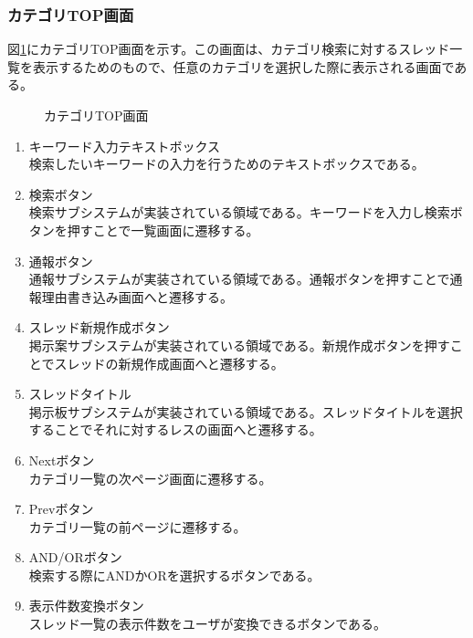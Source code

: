 \documentclass[a4j]{jarticle}
\begin{document}
\subsubsection{カテゴリTOP画面}
図\ref{fig:category_top}にカテゴリTOP画面を示す。この画面は、カテゴリ検索に対するスレッド一覧を表示するためのもので、任意のカテゴリを選択した際に表示される画面である。
\begin{figure}[H]
\centering
{}
\caption{カテゴリTOP画面}
\label{fig:category_top}
\end{figure}
\begin{enumerate}
  \renewcommand{\labelenumi}{\textcircled{\scriptsize \theenumi}}

\item キーワード入力テキストボックス\\
検索したいキーワードの入力を行うためのテキストボックスである。
\item 検索ボタン\\
検索サブシステムが実装されている領域である。キーワードを入力し検索ボタンを押すことで一覧画面に遷移する。
\item 通報ボタン\\
通報サブシステムが実装されている領域である。通報ボタンを押すことで通報理由書き込み画面へと遷移する。
\item スレッド新規作成ボタン\\
掲示案サブシステムが実装されている領域である。新規作成ボタンを押すことでスレッドの新規作成画面へと遷移する。
\item スレッドタイトル\\
掲示板サブシステムが実装されている領域である。スレッドタイトルを選択することでそれに対するレスの画面へと遷移する。
\item Nextボタン\\
カテゴリ一覧の次ページ画面に遷移する。
\item Prevボタン\\
カテゴリ一覧の前ページに遷移する。
\item AND/ORボタン\\
検索する際にANDかORを選択するボタンである。
\item 表示件数変換ボタン\\
スレッド一覧の表示件数をユーザが変換できるボタンである。

\end{enumerate}
\end{document}
